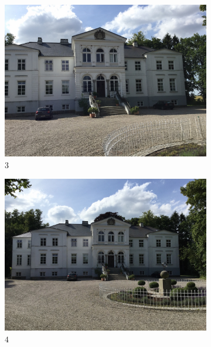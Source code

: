 \begin{figure}[h]
   \begin{subfigure}{.33\textwidth}
      \includegraphics[width=\textwidth]{gfx/manor_imgs/3.JPG}
      \caption{$3$}
   \end{subfigure}
   \begin{subfigure}{.33\textwidth}
      \includegraphics[width=\textwidth]{gfx/manor_imgs/4.JPG}
      \caption{$4$}
   \end{subfigure}
   \begin{subfigure}{.33\textwidth}

\end{subfigure}
\end{figure}
